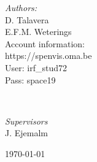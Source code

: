 \begin{titlepage}
	
	\begin{minipage}{0.4\textwidth}
		\begin{flushleft}
			\large
			\textit{Authors:}\\
			D. Talavera\\
			E.F.M. Weterings\\
			\vspace{1cm}
			Account information:\\
			https://spenvis.oma.be\\
			User: irf\_stud72\\
			Pass: space19
		\end{flushleft}
	\end{minipage}
	~
	\begin{minipage}{0.4\textwidth}
		\begin{flushright}
			\large
			\textit{Supervisors}\\
			J. Ejemalm\\
			\vspace{3.7cm}
		\end{flushright}
	\end{minipage}
	
	
	\vfill\vfill\vfill %
	
	{\large\today} %
	
	
\end{titlepage}